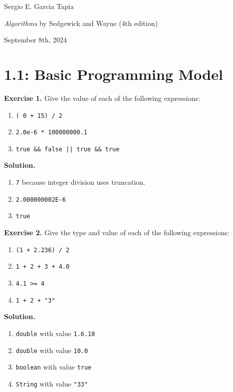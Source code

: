 \documentclass[12pt, a4paper]{article}
\newenvironment{ex}[2][Exercise]
{\par\medskip\noindent \textbf{#1 #2.}}
{\medskip}
\newenvironment{sol}[1][Solution]
{\par\medskip\noindent \textbf{#1.} }
{\medskip}
\begin{document}
	\noindent Sergio E. Garcia Tapia \hfill
	
	\noindent \emph{Algorithms} by Sedgewick and Wayne (4th edition) \cite{sedgewick_wayne}\hfill
	
	\noindent September 8th, 2024\hfill 
	\section*{1.1: Basic Programming Model}
	\begin{ex}{1}
		Give the value of each of the following expressions:
		\begin{enumerate}[label=(\alph*)]
			\item \texttt{( 0 + 15) / 2}
			\item \texttt{2.0e-6 * 100000000.1}
			\item \texttt{true \&\& false || true \&\& true}
		\end{enumerate}
	\end{ex}
	\begin{sol}
		\begin{enumerate}[label=(\alph*)]
			\item \texttt{7} because integer division uses truncation.
			\item \texttt{2.000000002E-6}
			\item \texttt{true}
		\end{enumerate}
	\end{sol}
	\begin{ex}{2}
		Give the type and value of each of the following expressions:
		\begin{enumerate}[label=(\alph*)]
			\item \texttt{(1 + 2.236) / 2}
			\item \texttt{1 + 2 + 3 + 4.0}
			\item \texttt{4.1 >= 4}
			\item \texttt{1 + 2 + "3"}
		\end{enumerate}
	\end{ex}
	\begin{sol}
		\begin{enumerate}[label=(\alph*)]
			\item \texttt{double} with value  \texttt{1.6.18}
			\item \texttt{double} with value \texttt{10.0}
			\item \texttt{boolean} with value \texttt{true}
			\item \texttt{String} with value \texttt{"33"}
		\end{enumerate}
	\end{sol}
\end{document}
